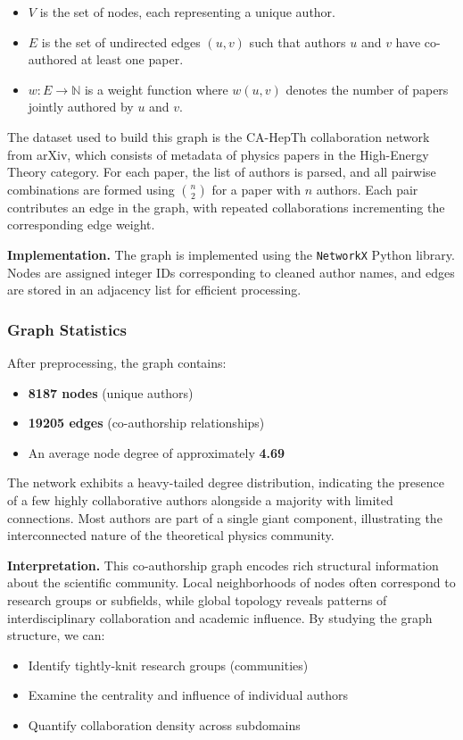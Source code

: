 \documentclass[12pt]{article}
\begin{document}
\begin{itemize}
    \item $V$ is the set of nodes, each representing a unique author.
    \item $E$ is the set of undirected edges $(u, v)$ such that authors $u$ and $v$ have co-authored at least one paper.
    \item $w: E \rightarrow \mathbb{N}$ is a weight function where $w(u,v)$ denotes the number of papers jointly authored by $u$ and $v$.
\end{itemize}

The dataset used to build this graph is the CA-HepTh collaboration network from arXiv, which consists of metadata of physics papers in the High-Energy Theory category. For each paper, the list of authors is parsed, and all pairwise combinations are formed using $\binom{n}{2}$ for a paper with $n$ authors. Each pair contributes an edge in the graph, with repeated collaborations incrementing the corresponding edge weight.

\vspace{0.3cm}
\textbf{Implementation.} The graph is implemented using the \texttt{NetworkX} Python library. Nodes are assigned integer IDs corresponding to cleaned author names, and edges are stored in an adjacency list for efficient processing.

\subsubsection*{Graph Statistics}

After preprocessing, the graph contains:
\begin{itemize}
    \item \textbf{8187 nodes} (unique authors)
    \item \textbf{19205 edges} (co-authorship relationships)
    \item An average node degree of approximately \textbf{4.69}
\end{itemize}

The network exhibits a heavy-tailed degree distribution, indicating the presence of a few highly collaborative authors alongside a majority with limited connections. Most authors are part of a single giant component, illustrating the interconnected nature of the theoretical physics community.

\vspace{0.3cm}
\textbf{Interpretation.} This co-authorship graph encodes rich structural information about the scientific community. Local neighborhoods of nodes often correspond to research groups or subfields, while global topology reveals patterns of interdisciplinary collaboration and academic influence. By studying the graph structure, we can:
\begin{itemize}
    \item Identify tightly-knit research groups (communities)
    \item Examine the centrality and influence of individual authors
    \item Quantify collaboration density across subdomains
\end{itemize}
\end{document}
